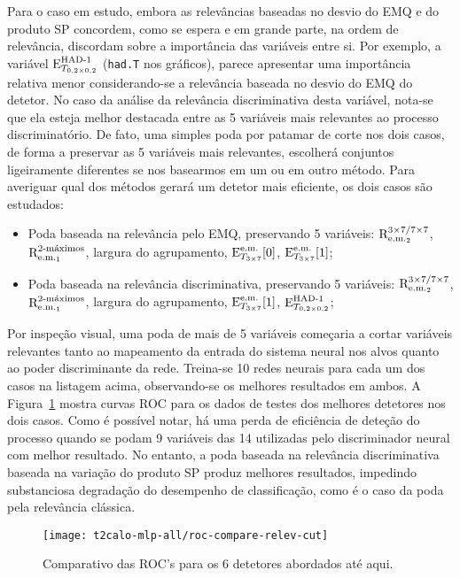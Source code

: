 Para o caso em estudo, embora as relevâncias baseadas no desvio do EMQ e do
produto SP concordem, como se espera e em grande parte, na ordem de
relevância, discordam sobre a importância das variáveis entre si. Por exemplo,
a variável $\ethad$ (\texttt{had.T} nos gráficos), parece apresentar uma
importância relativa menor considerando-se a relevância baseada no desvio do
EMQ do detetor. No caso da análise da relevância discriminativa desta
variável, nota-se que ela esteja melhor destacada entre as 5 variáveis mais
relevantes ao processo discriminatório. De fato, uma simples poda por patamar
de corte nos dois casos, de forma a preservar as 5 variáveis mais relevantes,
escolherá conjuntos ligeiramente diferentes se nos basearmos em um ou em outro
método. Para averiguar qual dos métodos gerará um detetor mais eficiente, os
dois casos são estudados:

\begin{itemize}
\item Poda baseada na relevância pelo EMQ, preservando 5 variáveis: $\rcore$,
$\eratio$, largura do agrupamento, $\etem[0]$, $\etem[1]$;
\item Poda baseada na relevância discriminativa, preservando 5 variáveis:
$\rcore$, $\eratio$, largura do agrupamento, $\etem[1]$, $\ethad$;
\end{itemize}

Por inspeção visual, uma poda de mais de 5 variáveis começaria a cortar
variáveis relevantes tanto ao mapeamento da entrada do sistema neural nos
alvos quanto ao poder discriminante da rede. Treina-se 10 redes neurais para
cada um dos casos na listagem acima, observando-se os melhores resultados em
ambos. A Figura~\ref{fig:t2calo-all-relev-cut-compare} mostra curvas ROC para
os dados de testes dos melhores detetores nos dois casos. Como é possível
notar, há uma perda de eficiência de deteção do processo quando se podam 9
variáveis das 14 utilizadas pelo discriminador neural com melhor resultado. No
entanto, a poda baseada na relevância discriminativa baseada na variação do
produto SP produz melhores resultados, impedindo substanciosa degradação do
desempenho de classificação, como é o caso da poda pela relevância clássica.

\begin{figure}
\begin{center}
\texttt{[image: t2calo-mlp-all/roc-compare-relev-cut]}
\end{center}
\caption{Comparativo das ROC's para os 6 detetores abordados até aqui.}
\label{fig:t2calo-all-relev-cut-compare}
\end{figure}

